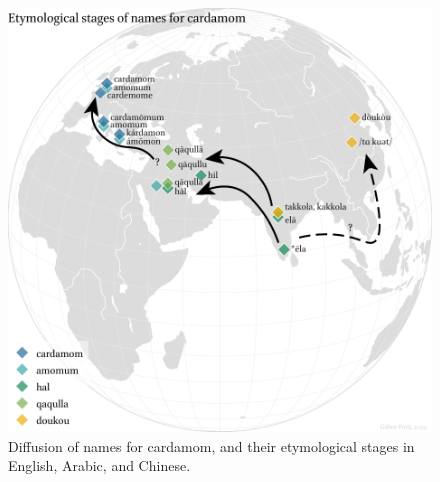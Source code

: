 \begin{figure}[ht]
    \centering
    \includegraphics[width=\textwidth]{imgs/plots/diffusion_cardamom_edited.pdf}
    \caption[Diffusion of names for cardamom, and their etymological stages.]{Diffusion of names for cardamom, and their etymological stages in English, Arabic, and Chinese.}
    \label{fig:diffusion_cardamom}
\end{figure}








